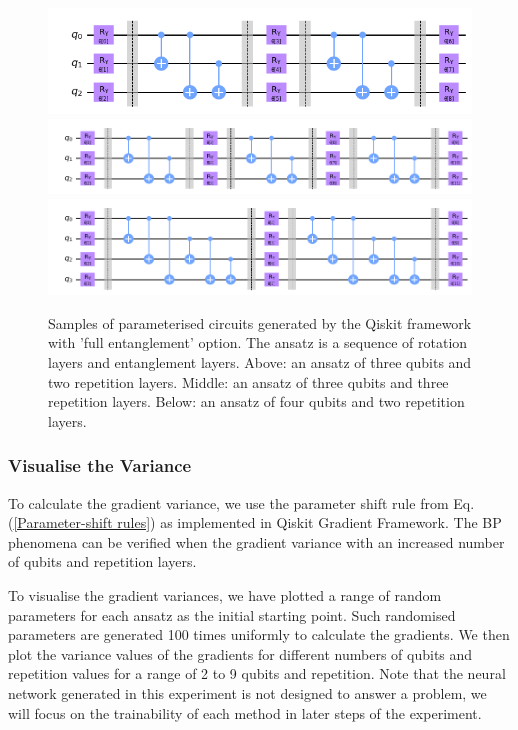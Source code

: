 \begin{figure}
    \includegraphics[width=\textwidth]{Artefact/Appendices/ansatz3-2.png}
    \includegraphics[width=\textwidth]{Artefact/Appendices/ansatz3-3.png}
    \includegraphics[width=\textwidth]{Artefact/Appendices/ansatz4-2.png}
    \caption{
        Samples of parameterised circuits generated by the Qiskit framework with 'full entanglement' option.
        The ansatz is a sequence of rotation layers and entanglement layers.
        Above: an ansatz of three qubits and two repetition layers.
        Middle: an ansatz of three qubits and three repetition layers.
        Below: an ansatz of four qubits and two repetition layers.
    }
    \label{Ansatz samples}
\end{figure}

\subsubsection{Visualise the Variance}
To calculate the gradient variance, we use the parameter shift rule from Eq. (\ref{Parameter-shift rules}) as implemented in Qiskit Gradient Framework.
The BP phenomena can be verified when the gradient variance with an increased number of qubits and repetition layers.

To visualise the gradient variances, we have plotted a range of random parameters for each ansatz as the initial starting point.
Such randomised parameters are generated 100 times uniformly to calculate the gradients.
We then plot the variance values of the gradients for different numbers of qubits and repetition values for a range of 2 to 9 qubits and repetition.
Note that the neural network generated in this experiment is not designed to answer a problem, we will focus on the trainability of each method in later steps of the experiment.

